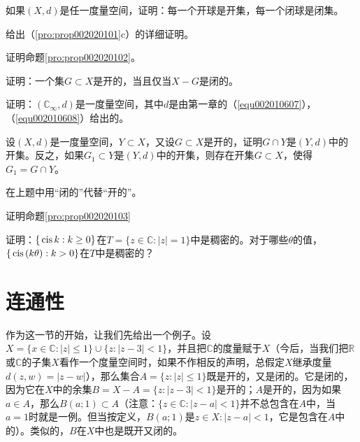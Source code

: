 \begin{exercise}
如果$(X, d)$是任一度量空间，证明：每一个开球是开集，每一个闭球是闭集。
\end{exercise}

\begin{exercise}
给出（\ref{pro:prop002020101}c）的详细证明。
\end{exercise}

\begin{exercise}
证明命题\ref{pro:prop002020102}。
\end{exercise}

\begin{exercise}
证明：一个集$G \subset X$是开的，当且仅当$X-G$是闭的。
\end{exercise}

\begin{exercise}
证明：$(\mathbb{C}_{\infty}, d)$是一度量空间，其中$d$是由第一章的（\ref{equ002010607}），（\ref{equ002010608}）给出的。
\end{exercise}

\begin{exercise}\label{exer002020108}
设$(X, d)$是一度量空间，$Y \subset X$，又设$G \subset X$是开的，证明$G \cap Y$是$(Y, d)$中的开集。反之，如果$G_1 \subset Y$是$(Y, d)$中的开集，则存在开集$G \subset X$，使得$G_1 = G \cap Y$。
\end{exercise}

\begin{exercise}\label{exer002020109}
在上题中用“闭的”代替“开的”。
\end{exercise}

\begin{exercise}
证明命题\ref{pro:prop002020103}
\end{exercise}

\begin{exercise}
证明：$\{\,\text{cis}\,{k}:k \ge 0\}$在$T=\{z \in \mathbb{C}:|z|=1\}$中是稠密的。对于哪些$\theta$的值，$\{\,\text{cis}\,(k\theta):k>0\}$在$T$中是稠密的？
\end{exercise}

\section{连通性}\label{subsection0020202}
作为这一节的开始，让我们先给出一个例子。设$X = \{ x \in \mathbb{C} : |z| \le 1\} \cup \{z: |z-3| < 1\}$，并且把$\mathbb{C}$的度量赋于$X$（今后，当我们把$\mathbb{R}$或$\mathbb{C}$的子集$X$看作一个度量空间时，如果不作相反的声明，总假定$X$继承度量$d(z, w) = |z-w|$），那么集合$A = \{z:|z| \le 1\}$既是开的，又是闭的。它是闭的，因为它在$X$中的余集$B = X-A = \{z:|z-3| < 1\}$是开的；$A$是开的，因为如果$a \in A$，那么$B(a;1) \subset A$（注意：$\{z \in \mathbb{C}: |z-a| < 1\}$并不总包含在$A$中，当$a=1$时就是一例。但当按定义，$B(a;1)$是$z \in X: |z-a|<1$，它是包含在$A$中的）。类似的，$B$在$X$中也是既开又闭的。

